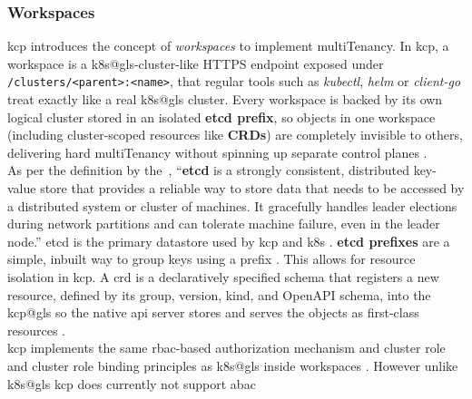 \documentclass[11pt, a4paper, oneside, listof=totoc]{scrartcl}
\begin{document}
            \subsubsection{Workspaces}\label{subsubsec:workspaces}
                \gls{kcp} introduces the concept of \textit{workspaces} to implement
                \gls{multiTenancy}.
                In \gls{kcp}, a workspace is a \gls{k8s@gls}-cluster-like HTTPS endpoint exposed
                under \texttt{/clusters/<parent>:<name>}, that regular tools such as
                \textit{kubectl}, \textit{\gls{helm}} or \textit{client-go} treat exactly like a real
                \gls{k8s@gls} cluster.
                Every workspace is backed by its own logical cluster stored in an isolated
                \textbf{\gls{etcd} prefix}, so objects in one workspace (including cluster-scoped
                resources like \textbf{CRDs}) are completely invisible to others, delivering hard
                \gls{multiTenancy} without spinning up separate control planes
                \parencite{kcpWorkspaces}.
                \\
                As per the definition by the~\cite{etcd}, \enquote{\textbf{\gls{etcd}} is a strongly
                consistent, distributed key-value store that provides a reliable way to store data
                that needs to be accessed by a distributed system or cluster of machines.
                It gracefully handles leader elections during network partitions and can tolerate
                machine failure, even in the leader node.}
                \gls{etcd} is the primary datastore used by \gls{kcp} and \gls{k8s}
                \parencites{kcpDevStorageToRest}[p.~214]{sun2021}.
                \textbf{\gls{etcd} prefixes} are a simple, inbuilt way to group keys using a prefix
                \parencite{etcdPrefix}.
                This allows for resource isolation in \gls{kcp}.\@
                A \gls{crd} is a declaratively specified schema that registers a new  resource,
                defined by its group, version, kind, and OpenAPI schema, into the \gls{kcp@gls} so
                the native \gls{api} server stores and serves the objects as first-class
                resources \parencite{kubernetesCRD}.
                \\
                \gls{kcp} implements the same \gls{rbac}-based authorization mechanism and cluster
                role and cluster role binding principles as \gls{k8s@gls} inside workspaces 
                \parencite{kcpAuthorization}.
                However unlike \gls{k8s@gls} \gls{kcp} does currently not support \gls{abac}
\end{document}
